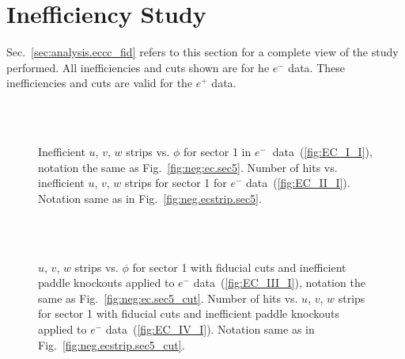 \section{ Inefficiency Study}
Sec.~\ref{sec:analysis.eccc_fid} refers to this section for a complete view of the  study performed. All inefficiencies and cuts shown are for he $e^-$ data. These inefficiencies and cuts are valid for the $e^+$ data.


\begin{figure}[!ht]
  \centering
   \quad
  \\
   \\

      \caption {Inefficient  $u$, $v$, $w$ strips vs. $\phi$ for sector 1 in  $e^{-} \ $ data~(\ref{fig:EC_I_I}), notation the same as Fig.~\ref{fig:neg:ec.sec5}. Number of hits vs. inefficient  $u$, $v$, $w$ strips for sector 1 for $e^-$ data~(\ref{fig:EC_II_I}). Notation same as in Fig.~\ref{fig:neg.ecstrip.sec5}.}
        \label{fig:EC_no_I}
\end{figure}



\begin{figure}[!ht]
  \centering
   \quad
  \\
   \\

      \caption { $u$, $v$, $w$ strips vs. $\phi$ for sector 1 with fiducial cuts and inefficient paddle knockouts applied to $e^-$ data~(\ref{fig:EC_III_I}), notation the same as Fig.~\ref{fig:neg:ec.sec5_cut}. Number of hits vs.  $u$, $v$, $w$ strips for sector 1 with fiducial cuts and inefficient paddle knockouts applied to $e^-$ data~(\ref{fig:EC_IV_I}). Notation same as in Fig.~\ref{fig:neg.ecstrip.sec5_cut}.}
        \label{fig:EC_cut_I}
\end{figure}


